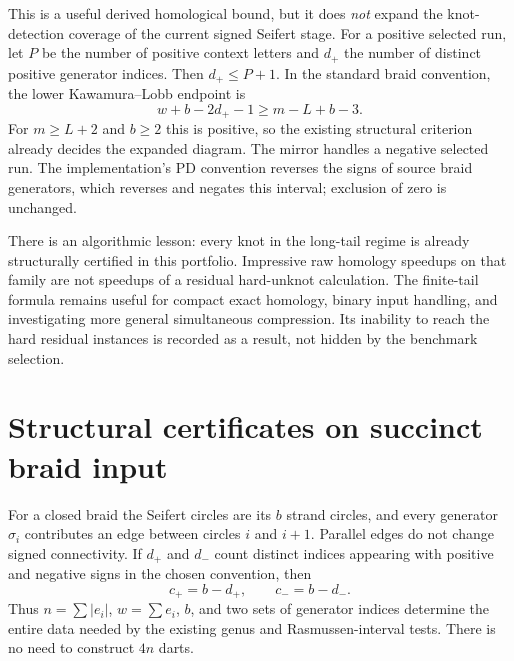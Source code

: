\documentclass[11pt]{article}
\theoremstyle{definition}
\theoremstyle{remark}
\begin{document}
This is a useful derived homological bound, but it does \emph{not} expand the knot-detection coverage of the current signed Seifert stage. For a positive selected run, let $P$ be the number of positive context letters and $d_+$ the number of distinct positive generator indices. Then $d_+\le P+1$. In the standard braid convention, the lower Kawamura--Lobb endpoint is
\[
 w+b-2d_+-1\ge m-L+b-3.
\]
For $m\ge L+2$ and $b\ge2$ this is positive, so the existing structural criterion already decides the expanded diagram. The mirror handles a negative selected run. The implementation's PD convention reverses the signs of source braid generators, which reverses and negates this interval; exclusion of zero is unchanged.

There is an algorithmic lesson: every knot in the long-tail regime is already structurally certified in this portfolio. Impressive raw homology speedups on that family are not speedups of a residual hard-unknot calculation. The finite-tail formula remains useful for compact exact homology, binary input handling, and investigating more general simultaneous compression. Its inability to reach the hard residual instances is recorded as a result, not hidden by the benchmark selection.

\section{Structural certificates on succinct braid input}
\label{sec:succinct}
For a closed braid the Seifert circles are its $b$ strand circles, and every generator $\sigma_i$ contributes an edge between circles $i$ and $i+1$. Parallel edges do not change signed connectivity. If $d_+$ and $d_-$ count distinct indices appearing with positive and negative signs in the chosen convention, then
\begin{equation}
 c_+=b-d_+,\qquad c_-=b-d_-.
 \label{eq:signedcounts}
\end{equation}
Thus $n=\sum|e_i|$, $w=\sum e_i$, $b$, and two sets of generator indices determine the entire data needed by the existing genus and Rasmussen-interval tests. There is no need to construct $4n$ darts.
\end{document}
